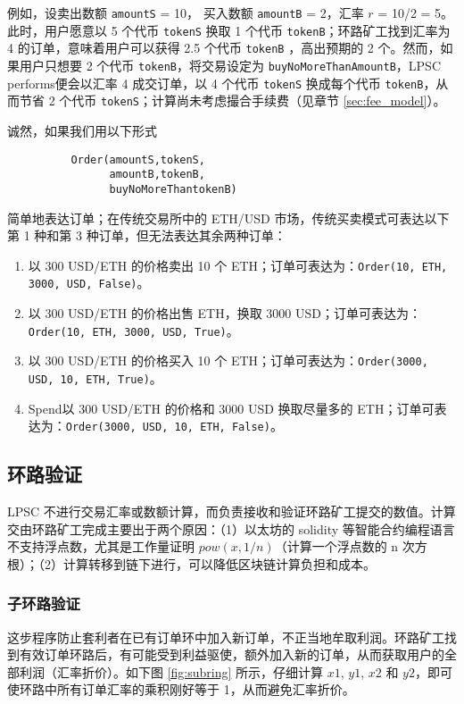 \documentclass[UTF8,nofonts]{ctexart}%
\begin{document}
\begin{multicols}{2}
例如，设卖出数额 \verb|amountS| = 10， 买入数额 \verb|amountB| = 2，汇率 $r$ = 10/2 = 5。此时，用户愿意以 5 个代币 \verb|tokenS| 换取 1 个代币 \verb|tokenB|；环路矿工找到汇率为 4 的订单，意味着用户可以获得 2.5 个代币 \verb|tokenB| ，高出预期的 2 个。然而，如果用户只想要 2 个代币 \verb|tokenB|，将交易设定为 \verb|buyNoMoreThanAmountB|，LPSC performs便会以汇率 4 成交订单，以 4 个代币 \verb|tokenS| 换成每个代币 \verb|tokenB|，从而节省 2 个代币 \verb|tokenS|；计算尚未考虑撮合手续费（见章节 \ref{sec:fee_model}）。

诚然，如果我们用以下形式


\begin{verbatim}
	      Order(amountS,tokenS,
	            amountB,tokenB,
	            buyNoMoreThantokenB)
\end{verbatim}

简单地表达订单；在传统交易所中的 ETH/USD 市场，传统买卖模式可表达以下第 1 种和第 3 种订单，但无法表达其余两种订单：

\begin{enumerate}
	\item 以 300 USD/ETH 的价格卖出 10 个 ETH；订单可表达为：\verb|Order(10, ETH, 3000, USD, False)|。
	\item 以 300 USD/ETH 的价格出售 ETH，换取 3000 USD；订单可表达为：\verb|Order(10, ETH, 3000, USD, True)|。
	\item 以 300 USD/ETH 的价格买入 10 个 ETH；订单可表达为：\verb|Order(3000, USD, 10, ETH, True)|。
	\item Spend以 300 USD/ETH 的价格和 3000 USD 换取尽量多的 ETH；订单可表达为：\verb|Order(3000, USD, 10, ETH, False)|。
\end{enumerate}



\subsection{环路验证\label{sec:ring_verification}}

LPSC 不进行交易汇率或数额计算，而负责接收和验证环路矿工提交的数值。计算交由环路矿工完成主要出于两个原因：（1）以太坊的 solidity\cite{dannen2017introducing} 等智能合约编程语言不支持浮点数，尤其是工作量证明 $pow(x, 1/n)$（计算⼀个浮点数的 n 次⽅根）；（2）计算转移到链下进行，可以降低区块链计算负担和成本。


\subsubsection{子环路验证\label{sec:sub_ring_check}}
这步程序防止套利者在已有订单环中加入新订单，不正当地牟取利润。环路矿工找到有效订单环路后，有可能受到利益驱使，额外加入新的订单，从而获取用户的全部利润（汇率折价）。如下图 \ref{fig:subring} 所示，仔细计算 $x1$, $y1$, $x2$ 和 $y2$，即可使环路中所有订单汇率的乘积刚好等于 1，从而避免汇率折价。


\end{multicols}
\end{document}
